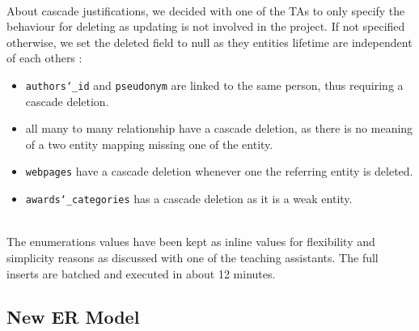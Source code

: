 \documentclass[doubleside, titlepage]{article}
\begin{document}
~\\
About cascade justifications, we decided with one of the TAs to only specify the behaviour for deleting as updating is not involved in the project. If not specified otherwise, we set the deleted field to null as they entities lifetime are independent of each others :
\begin{itemize}
	\item \texttt{authors\char`_id} and \texttt{pseudonym} are linked to the same person, thus requiring a cascade deletion.
	\item all many to many relationship have a cascade deletion, as there is no meaning of a two entity mapping missing one of the entity.
	\item \texttt{webpages} have a cascade deletion whenever one the referring entity is deleted.
	\item \texttt{awards\char`_categories} has a cascade deletion as it is a weak entity.
\end{itemize}
~\\
The enumerations values have been kept as inline values for flexibility and simplicity reasons as discussed with one of the teaching assistants. The full inserts are batched and executed in about 12 minutes.

\subsection{New ER Model}
\end{document}
